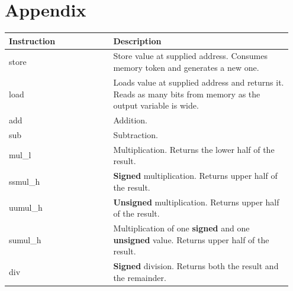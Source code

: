 \documentclass[course=eragp]{aspdoc}
\begin{document}
\clearpage


{}

\appendix
\section{Appendix}

\begin{center}
    \begin{longtable}{p{0.35\linewidth} | p{0.6\linewidth}}
        \hline
        Instruction  & Description                                                                                                                \\ [0.5ex]
        \hline
        store        & Store value at supplied address. Consumes memory token and generates a new one.                                            \\
        \hline
        load         & Loads value at supplied address and returns it. Reads as many bits from memory as the output
        variable is wide.                                                                                                                         \\
        \hline
        add          & Addition.                                                                                                                  \\
        \hline
        sub          & Subtraction.                                                                                                               \\
        \hline
        mul\_l       & Multiplication. Returns the lower half of the result.                                                                      \\
        \hline
        ssmul\_h     & \textbf{Signed} multiplication. Returns upper half of the result.                                                          \\
        \hline
        uumul\_h     & \textbf{Unsigned} multiplication. Returns upper half of the result.                                                        \\
        \hline
        sumul\_h     & Multiplication of one \textbf{signed} and one \textbf{unsigned} value. Returns upper half of the result.                   \\
        \hline
        div          & \textbf{Signed} division. Returns both the result and the remainder.                                                       \\

\end{longtable}
\end{center}
\end{document}
